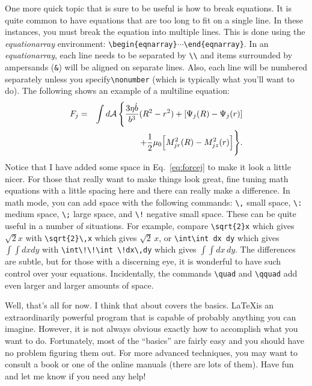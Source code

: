 \documentclass[twocolumn,pre,floats,aps,amsmath,amssymb]{revtex4}
\begin{document}
One more quick topic that is sure to be useful is how to break
equations.  It is quite common to have equations that are too long to
fit on a single line.  In these instances, you must break the equation
into multiple lines.  This is done using the \textit{equationarray}
environment: \verb!\begin{eqnarray}!$\cdots$\verb!\end{eqnarray}!.  In
an \textit{equationarray}, each line needs to be separated by
\verb!\\! and items surrounded by ampersands (\verb!&!) will be
aligned on separate lines.  Also, each line will be numbered
separately unless you specify\verb!\nonumber! (which is typically what
you'll want to do).  The following shows an example of a multiline
equation:
\begin{eqnarray}
F_{j} &=& \int d {\cal A}\, \Biggl\{ \frac{3\eta \dot{b}}{b^3}
(R^2 - r^2) + [\Psi_j(R) - \Psi_j(r)] \nonumber \\
&\ &\qquad\qquad + \frac{1}{2}\mu_0 \Bigl[ M_{jr}^2(R) -
M_{jz}^2(r) \Bigr] \Biggr\}.
\label{eq:forcej}
\end{eqnarray}
Notice that I have added some space in Eq.~\ref{eq:forcej} to make it
look a little nicer.  For those that really want to make things look
great, fine tuning math equations with a little spacing here and there
can really make a difference.  In math mode, you can add space with
the following commands: \verb!\,! small space, \verb!\:! medium space,
\verb!\;! large space, and \verb&\!& negative small space.  These can
be quite useful in a number of situations.  For example, compare
\verb!\sqrt{2}x! which gives $\sqrt{2}x$ with \verb!\sqrt{2}\,x! which
gives $\sqrt{2}\,x$, or \verb!\int\int dx dy! which gives $\int\int dx
dy$ with \verb&\int\!\!\int \!dx\,dy& which gives $\int\!\!\int
\!dx\,dy$. The differences are subtle, but for those with a discerning
eye, it is wonderful to have such control over your equations. 
Incidentally, the commands \verb!\quad! and \verb!\qquad! add even
larger and larger amounts of space.

Well, that's all for now.  I think that about covers the basics. 
\LaTeX is an extraordinarily powerful program that is capable of
probably anything you can imagine.  However, it is not always obvious
exactly how to accomplish what you want to do.  Fortunately, most of
the ``basics'' are fairly easy and you should have no problem figuring
them out.  For more advanced techniques, you may want to consult a
book or one of the online manuals (there are lots of them).  Have fun
and let me know if you need any help!
\end{document}
